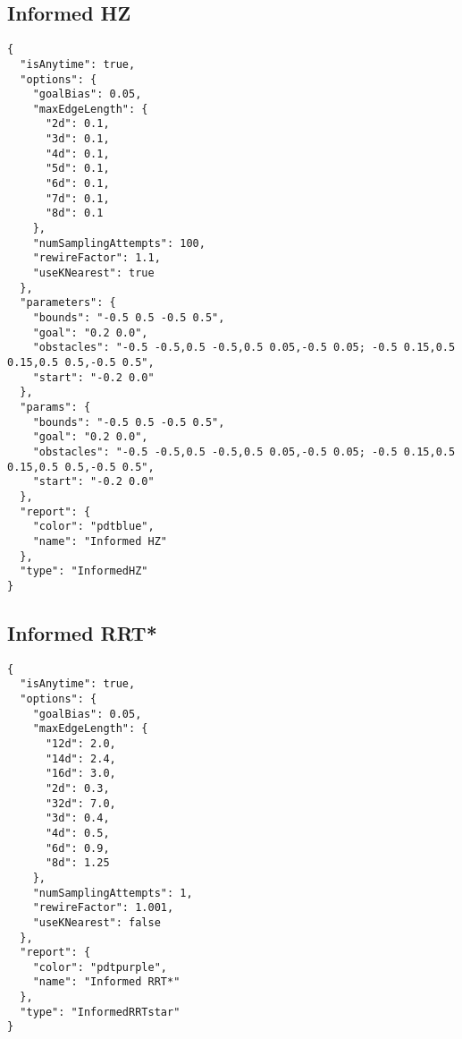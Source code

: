 \documentclass[titlepage]{article}
\begin{document}
\begin{appendices}
\subsection{Informed HZ}\label{sec:defaultInformedHZ-configuration}
\begin{lstlisting}
{
  "isAnytime": true,
  "options": {
    "goalBias": 0.05,
    "maxEdgeLength": {
      "2d": 0.1,
      "3d": 0.1,
      "4d": 0.1,
      "5d": 0.1,
      "6d": 0.1,
      "7d": 0.1,
      "8d": 0.1
    },
    "numSamplingAttempts": 100,
    "rewireFactor": 1.1,
    "useKNearest": true
  },
  "parameters": {
    "bounds": "-0.5 0.5 -0.5 0.5",
    "goal": "0.2 0.0",
    "obstacles": "-0.5 -0.5,0.5 -0.5,0.5 0.05,-0.5 0.05; -0.5 0.15,0.5 0.15,0.5 0.5,-0.5 0.5",
    "start": "-0.2 0.0"
  },
  "params": {
    "bounds": "-0.5 0.5 -0.5 0.5",
    "goal": "0.2 0.0",
    "obstacles": "-0.5 -0.5,0.5 -0.5,0.5 0.05,-0.5 0.05; -0.5 0.15,0.5 0.15,0.5 0.5,-0.5 0.5",
    "start": "-0.2 0.0"
  },
  "report": {
    "color": "pdtblue",
    "name": "Informed HZ"
  },
  "type": "InformedHZ"
}\end{lstlisting}
\subsection{Informed RRT*}\label{sec:defaultInformedRRTstar-configuration}
\begin{lstlisting}
{
  "isAnytime": true,
  "options": {
    "goalBias": 0.05,
    "maxEdgeLength": {
      "12d": 2.0,
      "14d": 2.4,
      "16d": 3.0,
      "2d": 0.3,
      "32d": 7.0,
      "3d": 0.4,
      "4d": 0.5,
      "6d": 0.9,
      "8d": 1.25
    },
    "numSamplingAttempts": 1,
    "rewireFactor": 1.001,
    "useKNearest": false
  },
  "report": {
    "color": "pdtpurple",
    "name": "Informed RRT*"
  },
  "type": "InformedRRTstar"
}\end{lstlisting}
\end{appendices}
\end{document}

